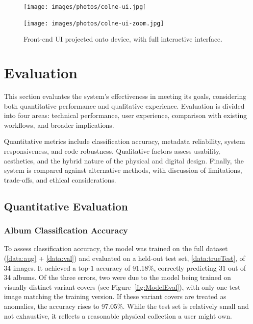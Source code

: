             \begin{figure}[h]
                \centering
                \begin{minipage}[b]{0.45\textwidth}
                    \centering
                    \texttt{[image: images/photos/colne-ui.jpg]}
                \end{minipage}
                \hfill
                \begin{minipage}[b]{0.45\textwidth}
                    \centering
                    \texttt{[image: images/photos/colne-ui-zoom.jpg]}
                \end{minipage}
                \caption{Front-end UI projected onto device, with full interactive interface.}
                \label{fig:colne}
            \end{figure}
    
    \section{Evaluation} \label{sec:evaluation}
    
        This section evaluates the system's effectiveness in meeting its goals, considering both quantitative performance and qualitative experience. Evaluation is divided into four areas: technical performance, user experience, comparison with existing workflows, and broader implications.
    
        Quantitative metrics include classification accuracy, metadata reliability, system responsiveness, and code robustness. Qualitative factors assess usability, aesthetics, and the hybrid nature of the physical and digital design. Finally, the system is compared against alternative methods, with discussion of limitations, trade-offs, and ethical considerations.
        
        \subsection{Quantitative Evaluation}
    
            \subsubsection{Album Classification Accuracy}
    
                To assess classification accuracy, the model was trained on the full dataset (\ref{data:aug} + \ref{data:val}) and evaluated on a held-out test set, \ref{data:trueTest}, of 34 images. It achieved a top-1 accuracy of 91.18\%, correctly predicting 31 out of 34 albums. Of the three errors, two were due to the model being trained on visually distinct variant covers (see Figure~\ref{fig:ModelEval}), with only one test image matching the training version. If these variant covers are treated as anomalies, the accuracy rises to 97.05\%. While the test set is relatively small and not exhaustive, it reflects a reasonable physical collection a user might own.
    
